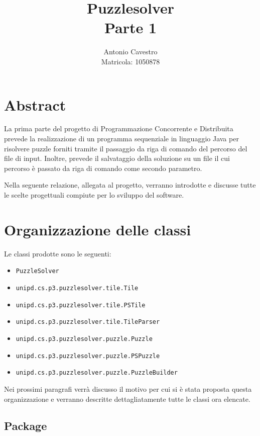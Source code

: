 \documentclass[a4paper, 12pt]{article}
\title{Puzzlesolver \\ \vspace{2 mm} {\small Parte 1}}
\author{Antonio Cavestro \\ \vspace{2 mm} {\small Matricola: 1050878}}
\date{}
\begin{document}
	
  \maketitle

  \section{Abstract}

    La prima parte del progetto di Programmazione Concorrente e Distribuita prevede la realizzazione di un programma sequenziale in linguaggio Java per risolvere puzzle forniti tramite il passaggio da riga di comando del percorso del file di input. Inoltre, prevede il salvataggio della soluzione su un file il cui percorso è passato da riga di comando come secondo parametro.

    Nella seguente relazione, allegata al progetto, verranno introdotte e discusse tutte le scelte progettuali compiute per lo sviluppo del software.

	\section{Organizzazione delle classi}

    Le classi prodotte sono le seguenti:

    \begin{itemize}

      \item \verb|PuzzleSolver|
      \item \verb|unipd.cs.p3.puzzlesolver.tile.Tile|
      \item \verb|unipd.cs.p3.puzzlesolver.tile.PSTile|
      \item \verb|unipd.cs.p3.puzzlesolver.tile.TileParser|
      \item \verb|unipd.cs.p3.puzzlesolver.puzzle.Puzzle|
      \item \verb|unipd.cs.p3.puzzlesolver.puzzle.PSPuzzle|
      \item \verb|unipd.cs.p3.puzzlesolver.puzzle.PuzzleBuilder|

    \end{itemize}

    Nei prossimi paragrafi verrà discusso il motivo per cui si è stata proposta questa organizzazione e verranno descritte dettagliatamente tutte le classi ora elencate.

    \subsection{Package}
\end{document}

